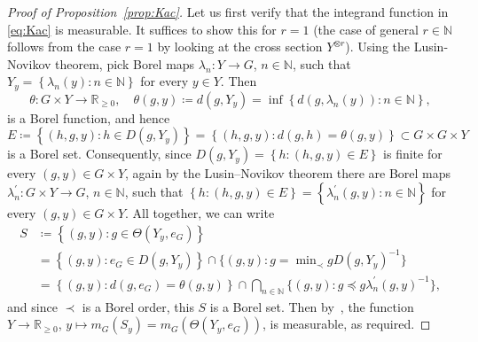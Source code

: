 \documentclass{amsart}
\numberwithin{equation}{subsection}
\theoremstyle{remark}
\begin{document}
\begin{proof}[Proof of Proposition~\ref{prop:Kac}]
Let us first verify that the integrand function in \eqref{eq:Kac} is measurable. It suffices to show this for \(r=1\) (the case of general \(r\in\mathbb{N}\) follows from the case \(r=1\) by looking at the cross section \(Y^{\otimes r}\)). Using the Lusin-Novikov theorem, pick Borel maps \(\lambda_{n}:Y\to G\), \(n\in\mathbb{N}\), such that \(Y_{y}=\left\{ \lambda_{n}\left(y\right):n\in\mathbb{N}\right\}\) for every \(y\in Y\). Then
\[\theta:G\times Y\longrightarrow\mathbb{R}_{\geq 0},\quad\theta\left(g,y\right)\coloneqq d\left(g,Y_{y}\right)=\inf\left\{ d\left(g,\lambda_{n}\left(y\right)\right):n\in\mathbb{N}\right\},\]
is a Borel function, and hence
\[E\coloneqq\left\{ \left(h,g,y\right):h\in D\left(g,Y_{y}\right)\right\} =\left\{ \left(h,g,y\right):d\left(g,h\right)=\theta\left(g,y\right)\right\} \subset G\times G\times Y\]
is a Borel set. Consequently, since \(D\left(g,Y_{y}\right)=\left\{h:\left(h,g,y\right)\in E\right\} \) is finite for every \(\left(g,y\right)\in G\times Y\), again by the Lusin--Novikov theorem there are Borel maps \(\lambda_{n}^{\prime}:G\times Y\to G\), \(n\in\mathbb{N}\), such that \(\left\{ h:\left(h,g,y\right)\in E\right\} =\left\{ \lambda_{n}^{\prime}\left(g,y\right):n\in\mathbb{N}\right\} \) for every \(\left(g,y\right)\in G\times Y\). All together, we can write
\begin{align*}
S
&\coloneqq\left\{ \left(g,y\right):g\in\Theta\left(Y_{y},e_{G}\right)\right\}\\
&=\left\{ \left(g,y\right):e_{G}\in D\left(g,Y_{y}\right)\right\}\cap\big\{ \left(g,y\right):g=\min\nolimits_{\prec}gD\left(g,Y_{y}\right)^{-1}\big\}\\
&=\left\{ \left(g,y\right):d\left(g,e_{G}\right)=\theta\left(g,y\right)\right\}\cap\bigcap\nolimits_{n\in\mathbb{N}}\big\{ \left(g,y\right):g\preccurlyeq g\lambda_{n}^{\prime}\left(g,y\right)^{-1}\big\},
\end{align*}
and since \(\prec\) is a Borel order, this \(S\) is a Borel set. Then by~\cite[Theorem (17.25)]{kechris2012classical}, the function \(Y\to\mathbb{R}_{\geq 0}\), \(y\mapsto m_{G}\left(S_{y}\right)=m_{G}\left(\Theta\left(Y_{y},e_{G}\right)\right)\), is measurable, as required.


\end{proof}
\end{document}
